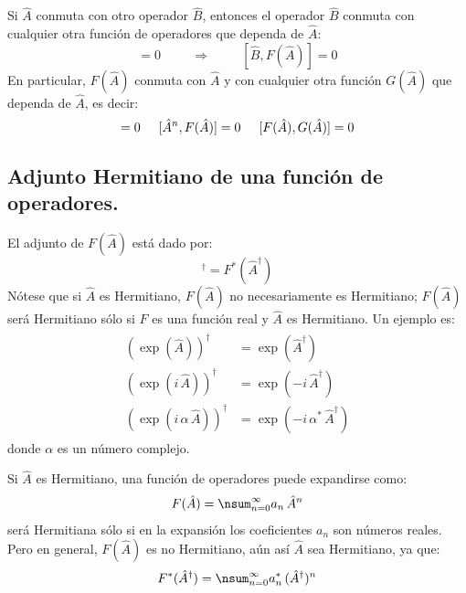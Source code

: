 Si $\hat{A}$ conmuta con otro operador $\hat{B}$, entonces el operador $\hat{B}$ conmuta con cualquier otra función de operadores que dependa de $\hat{A}$:
\begin{equation}
[\hat{A}, \hat{B}] = 0 \hspace{1cm} \Longrightarrow \hspace{1cm} [\hat{B}, F(\hat{A})] = 0
\label{eq:ecuacion_02_110}
\end{equation}
En particular, $F(\hat{A})$ conmuta con $\hat{A}$ y con cualquier otra función $G(\hat{A})$ que dependa de $\hat{A}$, es decir:
\begin{equation}
[\hat{A}, F(\hat{A})] = 0 \hspace{0.5cm} [\hat{A}^{n}, F(\hat{A})]= 0 \hspace{0.5cm} [F(\hat{A}), G(\hat{A})] = 0
\label{eq:ecuacion_02_111}
\end{equation}

\subsection*{Adjunto Hermitiano de una función de operadores.}

El adjunto de $F(\hat{A})$ está dado por:
\begin{equation}
[F(\hat{A})]^{\dagger} = F^{*}(\hat{A}^{\dagger})
\label{eq:ecuacion_02_112}
\end{equation}
Nótese que si $\hat{A}$ es Hermitiano, $F(\hat{A})$ no necesariamente es Hermitiano; $F(\hat{A})$ será Hermitiano sólo si $F$ es una función real y $\hat{A}$ es Hermitiano. Un ejemplo es:
\begin{align}
\begin{aligned}
\left( \exp(\hat{A}) \right)^{\dagger} &= \exp(\hat{A}^{\dagger}) \\[1em]
\left( \exp(i \, \hat{A}) \right)^{\dagger} &= \exp(-i \, \hat{A}^{\dagger}) \\[1em]
\left( \exp(i \, \alpha \, \hat{A}) \right)^{\dagger} &= \exp(-i \, \alpha^{*} \, \hat{A}^{\dagger})
\end{aligned}
\label{eq:ecuacion_02_113}
\end{align}
donde $\alpha$ es un número complejo.
\par
Si $\hat{A}$ es Hermitiano, una función de operadores puede expandirse como:
\begin{align*}
F(\hat{A}) = \nsum_{n=0}^{\infty} a_{n} \, \hat{A}^{n}
\end{align*}
será Hermitiana sólo si en la expansión los coeficientes $a_{n}$ son números reales. Pero en general, $F(\hat{A})$ es no Hermitiano, aún así $\hat{A}$ sea Hermitiano, ya que:
\begin{equation}
F^{*}(\hat{A}^{\dagger}) = \nsum_{n=0}^{\infty} a_{n}^{*} \, (\hat{A}^{\dagger})^{n}
\label{eq:ecuacion_02_114}
\end{equation}

